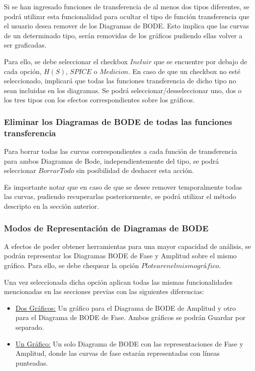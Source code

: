 Si se han ingresado funciones de transferencia de al menos dos tipos diferentes, se podrá utilizar esta funcionalidad para ocultar el tipo de función transferencia que el usuario desea remover de los Diagramas de BODE.
Esto implica que las curvas de un determinado tipo, serán removidas de los gráficos pudiendo ellas volver a ser graficadas.

Para ello, se debe seleccionar el checkbox $Incluir$ que se encuentre por debajo de cada opción, $H(S)$, $SPICE$ o $Medicion$. En caso de que un checkbox no esté seleccionado, implicará que todas las funciones transferencia de dicho tipo no sean incluidas en los diagramas. 
Se podrá seleccionar/desseleccionar uno, dos o los tres tipos con los efectos correspondientes sobre los gráficos.

\subsubsection{Eliminar los Diagramas de BODE de todas las funciones transferencia}

Para borrar todas las curvas correspondientes a cada función de transferencia para ambos Diagramas de Bode, independientemente del tipo, se podrá seleccionar $Borrar Todo$ sin posibilidad de deshacer esta acción. 

Es importante notar que en caso de que se desee remover temporalmente todas las curvas, pudiendo recuperarlas posteriormente, se podrá utilizar el método descripto en la sección anterior.

\subsubsection{Modos de Representación de Diagramas de BODE}

A efectos de poder obtener herramientas para una mayor capacidad de análisis, se podrán representar los Diagramas BODE de Fase y Amplitud sobre el mismo gráfico. 
Para ello, se debe chequear la opción $Plotear en el mismo gráfico$.

Una vez seleccionada dicha opción aplican todas las mismas funcionalidades mencionadas en las secciones previas con las siguientes diferencias:

\begin{itemize}
    \item \underline{Dos Gráficos:} Un gráfico para el Diagrama de BODE de Amplitud y otro para el Diagrama de BODE de Fase. Ambos gráficos se podrán Guardar por separado.
    \item \underline{Un Gráfico:} Un solo Diagrama de BODE con las representaciones de Fase y Amplitud, donde las curvas de fase estarán representadas con líneas punteadas.

\end{itemize}

